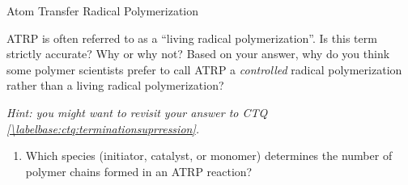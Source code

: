 \begin{activity}{Atom Transfer Radical Polymerization}
\begin{ctqs}
\begin{enumerate}
\begin{solution}[2in]
				\end{solution}
				
		\end{enumerate}
		
		
		
		
\end{ctqs}


\begin{exercises}

	\exercise ATRP is often referred to as a ``living radical polymerization''.  Is this term strictly accurate?  Why or why not?  Based on your answer, why do you think some polymer scientists prefer to call ATRP a \emph{controlled} radical polymerization rather than a living radical polymerization?
	
		\emph{Hint: you might want to revisit your answer to CTQ \ref{\labelbase:ctq:terminationsuprression}.}
		
		\begin{solution}\end{solution}		
		
	\exercise 
	
		\begin{enumerate}
	
			\item Which species (initiator, catalyst, or monomer) determines the number of polymer chains formed in an ATRP reaction?
		
		\begin{solution}\end{solution}
	

\end{enumerate}
\end{exercises}
\end{activity}
